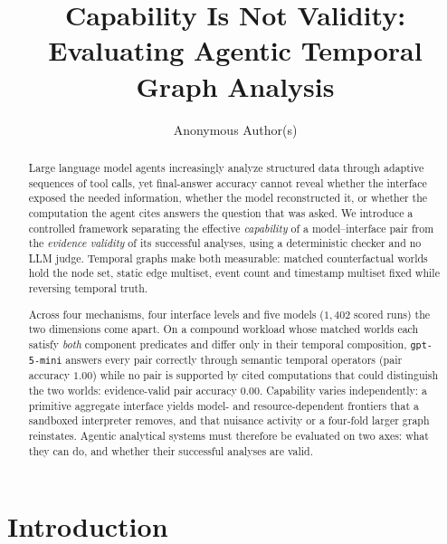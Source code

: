 \documentclass[sigconf,anonymous,review]{acmart}
\begin{document}
\title{Capability Is Not Validity:\\
       Evaluating Agentic Temporal Graph Analysis}

\author{Anonymous Author(s)}

\begin{abstract}
Large language model agents increasingly analyze structured data through adaptive sequences of tool
calls, yet final-answer accuracy cannot reveal whether the interface exposed the needed
information, whether the model reconstructed it, or whether the computation the agent cites answers
the question that was asked. We introduce a controlled framework separating the effective
\emph{capability} of a model--interface pair from the \emph{evidence validity} of its successful
analyses, using a deterministic checker and no LLM judge. Temporal graphs make both measurable:
matched counterfactual worlds hold the node set, static edge multiset, event count and timestamp
multiset fixed while reversing temporal truth.

Across four mechanisms, four interface levels and five models ($1{,}402$ scored runs) the two
dimensions come apart. On a compound workload whose matched worlds each satisfy \emph{both}
component predicates and differ only in their temporal composition, \texttt{gpt-5-mini} answers
every pair correctly through semantic temporal operators (pair accuracy $1.00$) while no pair
is supported by cited computations that could distinguish the two worlds: evidence-valid pair
accuracy $0.00$. Capability varies independently: a primitive aggregate interface yields model- and
resource-dependent frontiers that a sandboxed interpreter removes, and that nuisance activity or a
four-fold larger graph reinstates. Agentic analytical systems must therefore be evaluated on two
axes: what they can do, and whether their successful analyses are valid.
\end{abstract}


\maketitle

\section{Introduction}
\end{document}
